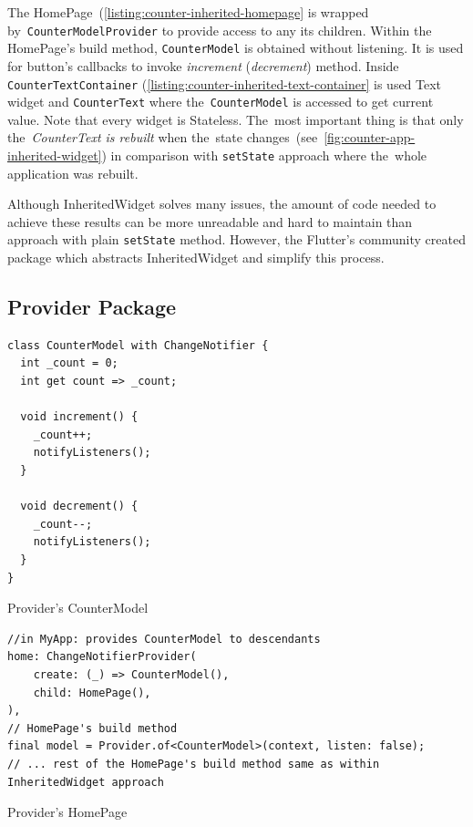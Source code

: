 The HomePage~(\cref{listing:counter-inherited-homepage} is wrapped by~\verb|CounterModelProvider| to provide access to any its children. Within the HomePage's build method, \verb|CounterModel| is obtained without listening. It is used for button's callbacks to invoke \textit{increment} (\textit{decrement}) method. Inside \verb|CounterTextContainer| (\cref{listing:counter-inherited-text-container} is used Text widget and \verb|CounterText| where the~\verb|CounterModel| is accessed to get current value. Note that every widget is Stateless. The~most important thing is that only the~\textit{CounterText is rebuilt} when the~state changes~(see~\cref{fig:counter-app-inherited-widget}) in comparison with \verb|setState| approach where the~whole application was rebuilt.

Although InheritedWidget solves many issues, the amount of code needed to achieve these results can be more unreadable and hard to maintain than approach with plain \verb|setState| method. However, the Flutter's community created package which abstracts InheritedWidget and simplify this process. 
\subsection{Provider Package}

\begin{listing}[ht]
\begin{verbatim}
class CounterModel with ChangeNotifier {
  int _count = 0;
  int get count => _count;

  void increment() {
    _count++;
    notifyListeners();
  }

  void decrement() {
    _count--;
    notifyListeners();
  }
}
\end{verbatim}
\caption{Provider's CounterModel}
\label{listing:counter-provider-model}
\end{listing}

\begin{listing}[ht]
\begin{verbatim}
//in MyApp: provides CounterModel to descendants
home: ChangeNotifierProvider(
    create: (_) => CounterModel(),
    child: HomePage(),
),
// HomePage's build method
final model = Provider.of<CounterModel>(context, listen: false);
// ... rest of the HomePage's build method same as within InheritedWidget approach
\end{verbatim}
\caption{Provider's HomePage}
\label{listing:counter-provider-home-page}
\end{listing}

